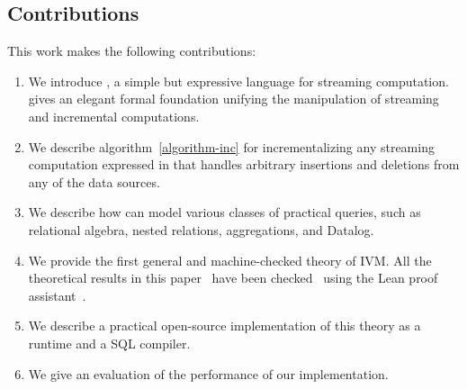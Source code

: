 \subsection{Contributions}

This work makes the following contributions:
\begin{enumerate}
  \item We introduce \dbsp, a simple but expressive language for
    streaming computation. \dbsp gives an elegant formal foundation
    unifying the manipulation of streaming and incremental
    computations.
  \item We describe algorithm~\ref{algorithm-inc} for incrementalizing
    any streaming computation expressed in \dbsp that handles
    arbitrary insertions and deletions from any of the data sources.
  \item We describe how \dbsp can model various classes of practical
    queries, such as relational algebra, nested relations,
    aggregations, and Datalog.
  \item We provide the first general and machine-checked theory of
    IVM.  All the theoretical results in this
    paper~\cite{budiu-vldb23} have been checked~\cite{dbsp-theory}
    using the Lean proof assistant~\cite{moura-cade15}.
  \item We describe a practical open-source implementation of this
    theory as a runtime and a SQL compiler.
  \item We give an evaluation of the performance of our
    implementation.
\end{enumerate}

